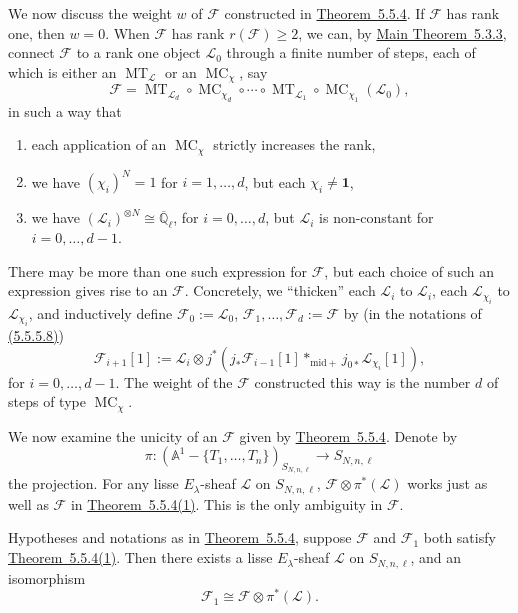 We now discuss the weight \(w\) of \(\mathcal{F}\) constructed in
\hyperref[thm:5.5.4]{Theorem~5.5.4}. If \(\mathcal{F}\) has rank one, then
\(w=0\). When \(\mathcal{F}\) has rank \(r(\mathcal{F})\geq 2\), we can, by
\hyperref[thm:5.3.3]{Main Theorem~5.3.3}, connect \(\mathcal{F}\) to a rank
one object \(\mathcal{L}_0\) through a finite number of steps, each of which is
either an \(\operatorname{MT}_{\mathcal{L}}\) or an
\(\operatorname{MC}_\chi\), say
\[
  \mathcal{F}=
  \operatorname{MT}_{\mathcal{L}_d}\circ\operatorname{MC}_{\chi_d}
  \circ\cdots\circ
  \operatorname{MT}_{\mathcal{L}_1}\circ\operatorname{MC}_{\chi_1}
  (\mathcal{L}_0),
\]
in such a way that
\begin{enumerate}[label=(\arabic*)]
\item each application of an \(\operatorname{MC}_\chi\) strictly increases the
rank,
\item we have \((\chi_i)^N=1\) for \(i=1,\ldots,d\), but each
\(\chi_i\neq\mathbf{1}\),
\item we have \((\mathcal{L}_i)^{\otimes N}\cong\overline{\mathbb{Q}}_\ell\),
for \(i=0,\ldots,d\), but \(\mathcal{L}_i\) is non-constant for
\(i=0,\ldots,d-1\).
\end{enumerate}
There may be more than one such expression for \(\mathcal{F}\), but each
choice of such an expression gives rise to an \(\mathcal{F}\). Concretely, we
``thicken'' each \(\mathcal{L}_i\) to \(\mathcal{L}_i\), each
\(\mathcal{L}_{\chi_i}\) to \(\mathcal{L}_{\chi_i}\), and inductively define
\(\mathcal{F}_0:=\mathcal{L}_0\), \(\mathcal{F}_1,\ldots,\mathcal{F}_d:=\mathcal{F}\)
by (in the notations of \hyperref[par:5.5.5.8]{(5.5.5.8)})
\[
  \mathcal{F}_{i+1}[1]:=
  \mathcal{L}_i\otimes
  j^*(j_*\mathcal{F}_{i-1}[1]*_{\mathrm{mid}+}j_{0*}\mathcal{L}_{\chi_i}[1]),
\]
for \(i=0,\ldots,d-1\). The weight of the \(\mathcal{F}\) constructed this way
is the number \(d\) of steps of type \(\operatorname{MC}_\chi\).

We now examine the unicity of an \(\mathcal{F}\) given by
\hyperref[thm:5.5.4]{Theorem~5.5.4}. Denote by
\[
  \pi:(\mathbb{A}^1-\{T_1,\ldots,T_n\})_{S_{N,n,\ell}}\to S_{N,n,\ell}
\]
the projection. For any lisse \(E_\lambda\)-sheaf \(\mathcal{L}\) on
\(S_{N,n,\ell}\), \(\mathcal{F}\otimes\pi^*(\mathcal{L})\) works just as well
as \(\mathcal{F}\) in \hyperref[thm:5.5.4]{Theorem~5.5.4(1)}. This is the only
ambiguity in \(\mathcal{F}\).

Hypotheses and notations as in \hyperref[thm:5.5.4]{Theorem~5.5.4}, suppose
\(\mathcal{F}\) and \(\mathcal{F}_1\) both satisfy
\hyperref[thm:5.5.4]{Theorem~5.5.4(1)}. Then there exists a lisse
\(E_\lambda\)-sheaf \(\mathcal{L}\) on \(S_{N,n,\ell}\), and an isomorphism
\[
  \mathcal{F}_1\cong\mathcal{F}\otimes\pi^*(\mathcal{L}).
\]

